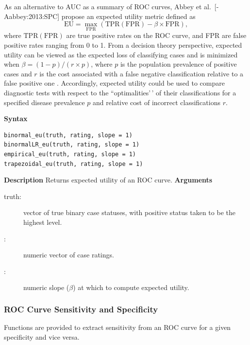 \documentclass[
]{jss}
\newenvironment{Description}{\textbf{Description}\vspace{0.5em}\newline}{\vspace{0.5em}\newline}
\begin{document}
As an alternative to AUC as a summary of ROC curves, Abbey et
al.~{[}-Aabbey:2013:SPC{]} propose an expected utility metric defined as
\[
\text{EU} = \max_\text{FPR}(\text{TPR}(\text{FPR}) - \beta \times \text{FPR}),
\] where \(\text{TPR}(\text{FPR})\) are true positive rates on the ROC
curve, and FPR are false positive rates ranging from 0 to 1. From a
decision theory perspective, expected utility can be viewed as the
expected loss of classifying cases and is minimized when
\(\beta = (1 - p) / (r \times p)\), where \(p\) is the population
prevalence of positive cases and \(r\) is the cost associated with a
false negative classification relative to a false positive one
\citep{Perkins:2006:IOC}. Accordingly, expected utility could be used to
compare diagnostic tests with respect to the ``optimalities'\,' of their
classifications for a specified disease prevalence \(p\) and relative
cost of incorrect classifications \(r\).

\begin{tcolorbox}[title=ROC Curve Expected Utility Functions]
\textbf{Syntax}
\begin{verbatim}
binormal_eu(truth, rating, slope = 1) 
binormalLR_eu(truth, rating, slope = 1)
empirical_eu(truth, rating, slope = 1) 
trapezoidal_eu(truth, rating, slope = 1)
\end{verbatim}
\begin{Description}
Returns expected utility of an ROC curve.
\end{Description}
\textbf{Arguments}
\begin{description}
\item[truth:] vector of true binary case statuses, with positive status taken to be the highest level.
\item[:] numeric vector of case ratings.
\item[:] numeric slope ($\beta$) at which to compute expected utility.
\end{description}
\end{tcolorbox}

\hypertarget{roc-curve-sensitivity-and-specificity}{%
\subsubsection{ROC Curve Sensitivity and
Specificity}\label{roc-curve-sensitivity-and-specificity}}

Functions are provided to extract sensitivity from an ROC curve for a
given specificity and vice versa.
\end{document}
